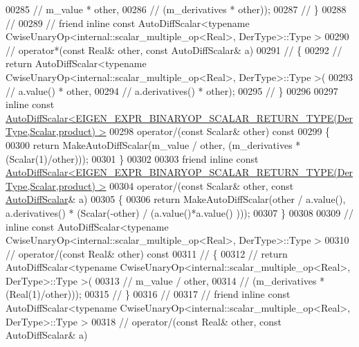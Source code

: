 \begin{DoxyCode}
00285 \textcolor{comment}{//         m\_value * other,}
00286 \textcolor{comment}{//         (m\_derivatives * other));}
00287 \textcolor{comment}{//     \}}
00288 \textcolor{comment}{//}
00289 \textcolor{comment}{//     friend inline const AutoDiffScalar<typename CwiseUnaryOp<internal::scalar\_multiple\_op<Real>,
       DerType>::Type >}
00290 \textcolor{comment}{//     operator*(const Real& other, const AutoDiffScalar& a)}
00291 \textcolor{comment}{//     \{}
00292 \textcolor{comment}{//       return AutoDiffScalar<typename CwiseUnaryOp<internal::scalar\_multiple\_op<Real>, DerType>::Type >(}
00293 \textcolor{comment}{//         a.value() * other,}
00294 \textcolor{comment}{//         a.derivatives() * other);}
00295 \textcolor{comment}{//     \}}
00296 
00297     \textcolor{keyword}{inline} \textcolor{keyword}{const} 
      \hyperlink{class_eigen_1_1_auto_diff_scalar}{AutoDiffScalar<EIGEN\_EXPR\_BINARYOP\_SCALAR\_RETURN\_TYPE(DerType,Scalar,product) >}
00298     operator/(\textcolor{keyword}{const} Scalar& other)\textcolor{keyword}{ const}
00299 \textcolor{keyword}{    }\{
00300       \textcolor{keywordflow}{return} MakeAutoDiffScalar(m\_value / other, (m\_derivatives * (Scalar(1)/other)));
00301     \}
00302 
00303     \textcolor{keyword}{friend} \textcolor{keyword}{inline} \textcolor{keyword}{const} 
      \hyperlink{class_eigen_1_1_auto_diff_scalar}{AutoDiffScalar<EIGEN\_EXPR\_BINARYOP\_SCALAR\_RETURN\_TYPE(DerType,Scalar,product) >}
00304     operator/(\textcolor{keyword}{const} Scalar& other, \textcolor{keyword}{const} \hyperlink{class_eigen_1_1_auto_diff_scalar}{AutoDiffScalar}& a)
00305     \{
00306       \textcolor{keywordflow}{return} MakeAutoDiffScalar(other / a.value(), a.derivatives() * (Scalar(-other) / (a.value()*a.value()
      )));
00307     \}
00308 
00309 \textcolor{comment}{//     inline const AutoDiffScalar<typename CwiseUnaryOp<internal::scalar\_multiple\_op<Real>, DerType>::Type
       >}
00310 \textcolor{comment}{//     operator/(const Real& other) const}
00311 \textcolor{comment}{//     \{}
00312 \textcolor{comment}{//       return AutoDiffScalar<typename CwiseUnaryOp<internal::scalar\_multiple\_op<Real>, DerType>::Type >(}
00313 \textcolor{comment}{//         m\_value / other,}
00314 \textcolor{comment}{//         (m\_derivatives * (Real(1)/other)));}
00315 \textcolor{comment}{//     \}}
00316 \textcolor{comment}{//}
00317 \textcolor{comment}{//     friend inline const AutoDiffScalar<typename CwiseUnaryOp<internal::scalar\_multiple\_op<Real>,
       DerType>::Type >}
00318 \textcolor{comment}{//     operator/(const Real& other, const AutoDiffScalar& a)}

\end{DoxyCode}
